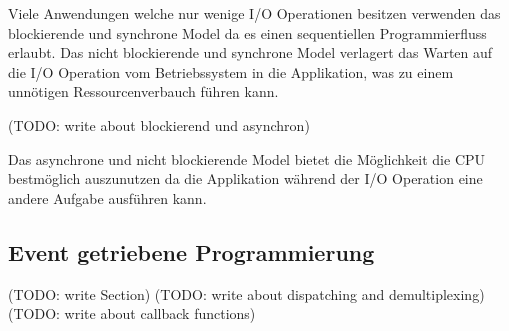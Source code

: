 Viele Anwendungen welche nur wenige I/O Operationen besitzen verwenden das blockierende und synchrone Model da es einen sequentiellen Programmierfluss erlaubt. Das nicht blockierende und synchrone Model verlagert das Warten auf die I/O Operation vom Betriebssystem in die Applikation, was zu einem unnötigen Ressourcenverbauch führen kann. 

(TODO: write about blockierend und asynchron)

Das asynchrone und nicht blockierende Model bietet die Möglichkeit die CPU bestmöglich auszunutzen da die Applikation während der I/O Operation eine andere Aufgabe ausführen kann.

\subsection{Event getriebene Programmierung}
(TODO: write Section)
(TODO: write about dispatching and demultiplexing)
(TODO: write about callback functions)